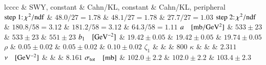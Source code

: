 \begin{tabular}{lcccc}\hline\hline
										& SWY, constant 		& Cahn/KL, constant		& Cahn/KL, peripheral	\cr\hline\hline
$\hbox{step 1:}\, \chi^2/\hbox{ndf}$	& $ 48.0 / 27 = 1.78$	& $ 48.1 / 27 = 1.78$	& $ 27.7 / 27 = 1.03$	\cr
$\hbox{step 2:}\, \chi^2/\hbox{ndf}$	& $ 180.8 / 58 = 3.12$	& $ 181.2 / 58 = 3.12$	& $ 64.3 / 58 = 1.11$	\cr
\hline
$a\quad[{\rm mb/GeV^2}]$				 		& $533 \pm 23$			& $533 \pm 23$			& $551 \pm 23$			\cr
$b_1\quad[{\rm GeV^{-2}}]$				 		& $19.42 \pm  0.05$ 	& $19.42 \pm  0.05$		& $19.74 \pm  0.05$		\cr
\hline
$\rho$							 		& $0.05 \pm  0.02$  	& $0.05 \pm  0.02$		& $0.10 \pm  0.02$		\cr
$\zeta_1$						 		&					 	&					 	& $800$					\cr
$\kappa$						 		&					 	&					 	& $2.311$				\cr
$\nu\quad[{\rm GeV^{-2}}]$				 		&					 	&					 	& $8.161$				\cr
\hline
$\sigma_{\rm tot}\quad[{\rm mb}]$		 		& $102.0 \pm  2.2$		& $102.0 \pm  2.2$		& $103.4 \pm  2.3$		\cr
\hline\hline
\end{tabular}
